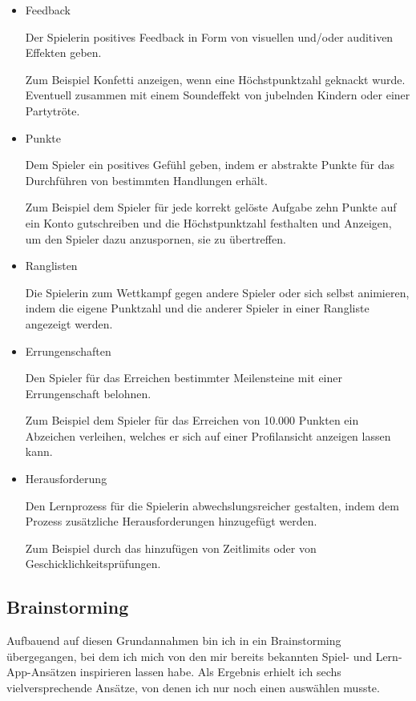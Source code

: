 \begin{itemize}
  \item Feedback
  
  Der Spielerin positives Feedback in Form von visuellen und/oder auditiven Effekten geben.

  Zum Beispiel Konfetti anzeigen, wenn eine Höchstpunktzahl geknackt wurde. Eventuell zusammen mit einem Soundeffekt von jubelnden Kindern oder einer Partytröte.

  \item Punkte
  
  Dem Spieler ein positives Gefühl geben, indem er abstrakte Punkte für das Durchführen von bestimmten Handlungen erhält.

  Zum Beispiel dem Spieler für jede korrekt gelöste Aufgabe zehn Punkte auf ein Konto gutschreiben und die Höchstpunktzahl festhalten und Anzeigen, um den Spieler dazu anzuspornen, sie zu übertreffen.

  \item Ranglisten
  
  Die Spielerin zum Wettkampf gegen andere Spieler oder sich selbst animieren, indem die eigene Punktzahl und die anderer Spieler in einer Rangliste angezeigt werden.

  \item Errungenschaften
  
  Den Spieler für das Erreichen bestimmter Meilensteine mit einer Errungenschaft belohnen.

  Zum Beispiel dem Spieler für das Erreichen von 10.000 Punkten ein Abzeichen verleihen, welches er sich auf einer Profilansicht anzeigen lassen kann.

  \item Herausforderung
  
  Den Lernprozess für die Spielerin abwechslungsreicher gestalten, indem dem Prozess zusätzliche Herausforderungen hinzugefügt werden.
  
  Zum Beispiel durch das hinzufügen von Zeitlimits oder von Geschicklichkeitsprüfungen.
\end{itemize}

\subsection{Brainstorming}

Aufbauend auf diesen Grundannahmen bin ich in ein Brainstorming übergegangen, bei dem ich mich von den mir bereits bekannten Spiel- und Lern-App-Ansätzen inspirieren lassen habe.
Als Ergebnis erhielt ich sechs vielversprechende Ansätze, von denen ich nur noch einen auswählen musste.

